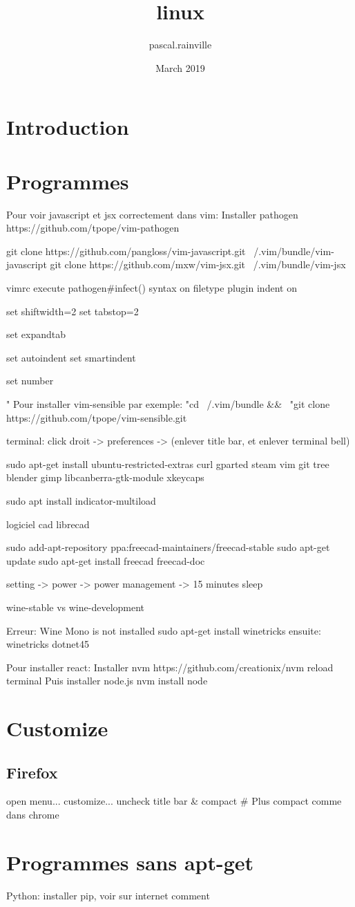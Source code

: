 \documentclass{article}
\title{linux}
\author{pascal.rainville }
\date{March 2019}
\begin{document}
\maketitle

\section{Introduction}

\section{Programmes}
  
Pour voir javascript et jsx correctement dans vim:
Installer pathogen
https://github.com/tpope/vim-pathogen

git clone https://github.com/pangloss/vim-javascript.git ~/.vim/bundle/vim-javascript
git clone https://github.com/mxw/vim-jsx.git ~/.vim/bundle/vim-jsx

vimrc
execute pathogen#infect()
syntax on
filetype plugin indent on

set shiftwidth=2
set tabstop=2

set expandtab

set autoindent
set smartindent

set number

" Pour installer vim-sensible par exemple:
"cd ~/.vim/bundle && \
"git clone https://github.com/tpope/vim-sensible.git
  
terminal:
click droit -> preferences -> (enlever title bar, et enlever terminal bell)


sudo apt-get install ubuntu-restricted-extras curl gparted steam vim git tree blender gimp libcanberra-gtk-module xkeycaps

sudo apt install indicator-multiload

logiciel cad
 librecad

sudo add-apt-repository ppa:freecad-maintainers/freecad-stable
sudo apt-get update
sudo apt-get install freecad freecad-doc

setting -> power -> power management -> 15 minutes sleep

wine-stable vs wine-development

Erreur: Wine Mono is not installed
sudo apt-get install winetricks
ensuite:
winetricks dotnet45

Pour installer react:
Installer nvm
https://github.com/creationix/nvm
reload terminal
Puis installer node.js
nvm install node

\section{Customize}

\subsection{Firefox}
  open menu... customize... uncheck title bar & compact # Plus compact comme dans chrome

\section{Programmes sans apt-get}

Python: installer pip, voir sur internet comment
\end{document}

